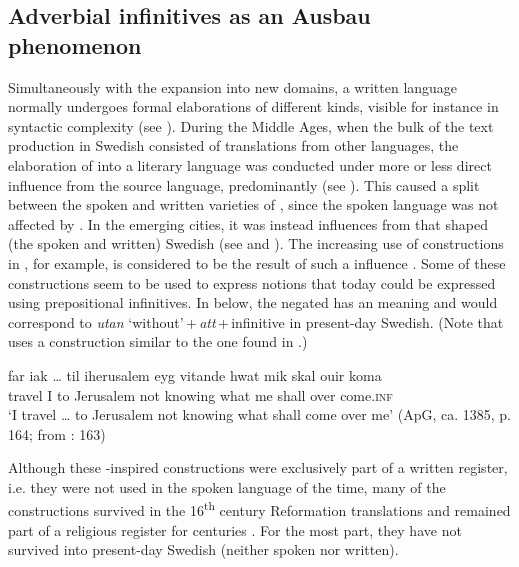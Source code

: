 \documentclass[output=paper]{langscibook}
\begin{document}
\subsection{Adverbial infinitives as an Ausbau phenomenon}\label{sec:kalm:5.2}


Simultaneously with the expansion into new domains, a written language normally undergoes formal elaborations of different kinds, visible for instance in syntactic complexity (see \cites[38--39]{Fischer2007}[]{Kloss1967}). During the Middle Ages, when the bulk of the text production in Swedish consisted of translations from other languages, the elaboration of  into a literary language was conducted under more or less direct influence from the source language, predominantly  (see \citealt{Wollin1981,Wollin1983,Hoder2009, Hoder2010}). This caused a split between the spoken and written varieties of , since the spoken language was not affected by . In the emerging cities, it was instead influences from  that shaped (the spoken and written) Swedish (see  and ). The increasing use of  constructions in , for example, is considered to be the result of such a  influence \citep{Ahlberg1942,Hoder2010}. Some of these  constructions seem to be used to express  notions that today could be expressed using prepositional infinitives. In  below, the negated  has an  meaning and would correspond to \textit{utan} ‘without’\,+\,\textit{att}\,+\,infinitive in present-day Swedish. (Note that  uses a construction similar to the one found in .)


\ea 
\label{ex:kalm:33}
 \gll far {iak …} til iherusalem eyg vitande hwat mik skal ouir koma\\ 
travel I to Jerusalem not knowing what me shall over come.\textsc{inf}\\
 \glt ‘I travel … to Jerusalem not knowing what shall come over me’ (ApG, ca. 1385, p. 164; from \citealt{Ahlberg1942}: 163)
\z


Although these -inspired constructions were exclusively part of a written register, i.e. they were not used in the spoken language of the time, many of the  constructions survived in the 16\textsuperscript{th} century Reformation  translations and remained part of a religious register for centuries \citep[17–19]{Stahle1970}. For the most part, they have not survived into present-day Swedish (neither spoken nor written). 
\end{document}
